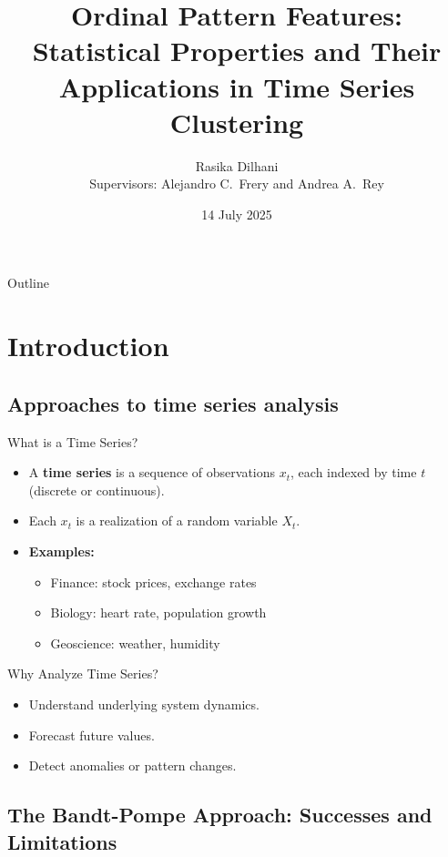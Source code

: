 \documentclass{beamer}
\title{Ordinal Pattern Features: Statistical Properties and Their Applications in Time Series Clustering}
\author[Rasika Dilhani]{{Rasika Dilhani}\\{\small Supervisors: Alejandro C.\ Frery and Andrea A.\ Rey}}
\institute[VUW]{Victoria University of Wellington}
\date{14 July 2025}
\begin{document}
\maketitle
\begin{frame}{Outline}
    \tableofcontents
\end{frame}

\section{Introduction}
\subsection{Approaches to time series analysis}

\begin{frame}{What is a Time Series?}
	\begin{itemize}
		\item A \textbf{time series} is a sequence of observations $x_t$, each indexed by time $t$ (discrete or continuous).
		\item Each $x_t$ is a realization of a random variable $X_t$.
		\item \textbf{Examples:}
		\begin{itemize}
			\item Finance: stock prices, exchange rates
			\item Biology: heart rate, population growth
			\item Geoscience: weather, humidity
		\end{itemize}
	\end{itemize}
\end{frame}

\begin{frame}{Why Analyze Time Series?}
	\begin{itemize}
		\item Understand underlying system dynamics.
		\item Forecast future values.
		\item Detect anomalies or pattern changes. %
	\end{itemize}
\end{frame}


\subsection{The Bandt-Pompe Approach: Successes and Limitations}
\end{document}
